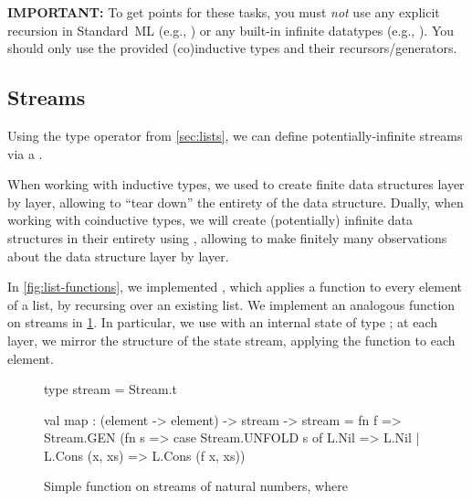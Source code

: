 \documentclass[11pt]{article}
\begin{document}
{\color{red}\textbf{IMPORTANT:}}
To get points for these tasks, you must \emph{not} use any explicit recursion in Standard~ML (e.g., ) or any built-in infinite datatypes (e.g., ).
You should only use the provided (co)inductive types and their recursors/generators.

\subsection{Streams}\label{sec:streams}

Using the  type operator from \cref{sec:lists}, we can define potentially-infinite streams via a .

When working with inductive types, we used  to create finite data structures layer by layer, allowing  to ``tear down'' the entirety of the data structure.
Dually, when working with coinductive types, we will create (potentially) infinite data structures in their entirety using , allowing  to make finitely many observations about the data structure layer by layer.

In \cref{fig:list-functions}, we implemented , which applies a function to every element of a list, by recursing over an existing list.
We implement an analogous  function on streams in \cref{fig:stream-functions}.
In particular, we use  with an internal state of type ; at each layer, we mirror the structure of the state stream, applying the function  to each element.
\begin{figure}
  \begin{codeblock}
  type stream = Stream.t

  val map : (element -> element) -> stream -> stream =
    fn f =>
      Stream.GEN
        (fn s =>
          case Stream.UNFOLD s of
            L.Nil          => L.Nil
          | L.Cons (x, xs) => L.Cons (f x, xs))
  \end{codeblock}
  \caption{Simple function on streams of natural numbers, where }
  \label{fig:stream-functions}
\end{figure}
\end{document}
